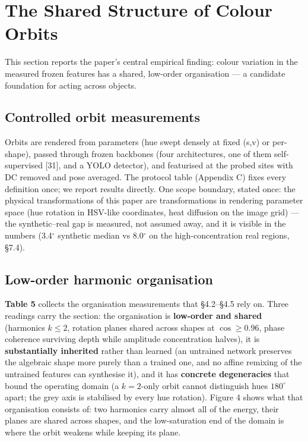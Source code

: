 \section{The Shared Structure of Colour Orbits}

This section reports the paper's central empirical finding: colour variation in the measured frozen features has a shared, low-order organisation --- a candidate foundation for acting across objects.

\subsection{Controlled orbit measurements}

Orbits are rendered from parameters (hue swept densely at fixed (s,v) or per-shape), passed through frozen backbones (four architectures, one of them self-supervised [31], and a YOLO detector), and featurised at the probed sites with DC removed and pose averaged. The protocol table (Appendix C) fixes every definition once; we report results directly. One scope boundary, stated once: the physical transformations of this paper are transformations in rendering parameter space (hue rotation in HSV-like coordinates, heat diffusion on the image grid) --- the synthetic--real gap is measured, not assumed away, and it is visible in the numbers (3.4$^\circ$ synthetic median vs 8.0$^\circ$ on the high-concentration real regions, \S{}7.4).

\subsection{Low-order harmonic organisation}

\textbf{Table 5} collects the organisation measurements that \S{}4.2--\S{}4.5 rely on. Three readings carry the section: the organisation is \textbf{low-order and shared} (harmonics $k\le2$, rotation planes shared across shapes at $\cos\ge0.96$, phase coherence surviving depth while amplitude concentration halves), it is \textbf{substantially inherited} rather than learned (an untrained network preserves the algebraic shape more purely than a trained one, and no affine remixing of the untrained features can synthesise it), and it has \textbf{concrete degeneracies} that bound the operating domain (a $k=2$-only orbit cannot distinguish hues $180^\circ$ apart; the grey axis is stabilised by every hue rotation). Figure 4 shows what that organisation consists of: two harmonics carry almost all of the energy, their planes are shared across shapes, and the low-saturation end of the domain is where the orbit weakens while keeping its plane.

